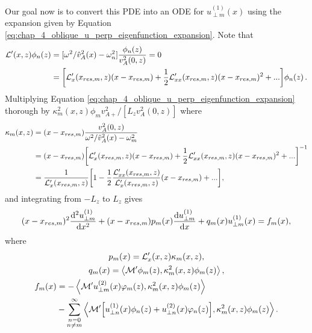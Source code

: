 Our goal now is to convert this PDE into an ODE for $u_{\perp m}^{(1)}(x)$ using the expansion given by Equation \eqref{eq:chap_4_oblique_u_perp_eigenfunction_expansion}. Note that
\[\begin{aligned}
\mathcal{L}'(x,z)\phi_n(z) &= [\omega^2/\hat{v}_A^2(x) - \omega_n^2]\frac{\phi_n(z)}{v_A^2(0,z)} = 0 \\
&= \qty[\mathcal{L}_x'(x_{res,m},z)(x-x_{res,m}) + \frac{1}{2}\mathcal{L}_{xx}'(x_{res,m},z)(x-x_{res,m})^2 + ...]\phi_n(z)\,.
\end{aligned}
\]
Multiplying Equation \eqref{eq:chap_4_oblique_u_perp_eigenfunction_expansion} thorough by $\kappa_m^2(x,z)\phi_mv_{A+}^2/[L_zv_A^2(0,z)]$ where
\begin{equation}
\begin{aligned}
    \kappa_m(x,z) &= (x-x_{res,m})\frac{v_A^2(0,z)}{\omega^2/\hat{v}_A^2(x) - \omega_m^2} \\
    &= (x-x_{res,m})\qty[\mathcal{L}_x'(x_{res,m},z)(x-x_{res,m}) + \frac{1}{2}\mathcal{L}_{xx}'(x_{res,m},z)(x-x_{res,m})^2 + ...]^{-1} \\
    &= \frac{1}{\mathcal{L}_x'(x_{res,m},z)}\qty[1 - \frac{1}{2}\frac{\mathcal{L}_{xx}'(x_{res,m},z)}{\mathcal{L}_x'(x_{res,m},z)}(x-x_{res,m}) + ...], \\
\end{aligned}
\end{equation}
and integrating from $-L_z$ to $L_z$ gives
\begin{equation}
    \label{eq:u_perpm_1_ode1}
    (x-x_{res,m})^2\dv[2]{u_{\perp m}^{(1)}}{x}+(x-x_{res,m})p_m(x)\dv{u_{\perp m}^{(1)}}{x}+q_m(x)u_{\perp m}^{(1)}(x) = f_m(x),
\end{equation}
where
\begin{gather}
    p_m(x) = \mathcal{L}_x'(x,z)\kappa_m(x,z), \\
    q_m(x) = \left\langle\mathcal{M}'\phi_m(z), \kappa_m^2(x,z)\phi_m(z)\right\rangle, \\
    \begin{aligned}
    f_m(x) &= -\left\langle\mathcal{M}'u_{\perp m}^{(2)}(x)\varphi_m(z), \kappa_m^2(x,z)\phi_m(z) \right\rangle \\
    &-\sum_{\substack{n=0 \\ n\ne m}}^\infty \left\langle\mathcal{M}'\qty[u_{\perp n}^{(1)}(x)\phi_n(z) + u_{\perp n}^{(2)}(x)\varphi_n(z)],\kappa_m^2(x,z)\phi_m(z)\right\rangle.
    \end{aligned}
\end{gather}

